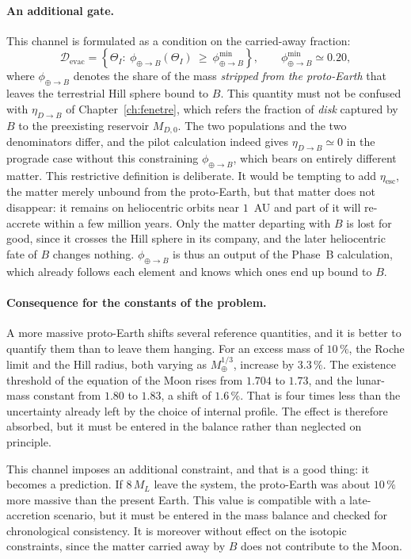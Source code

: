 \documentclass[11pt,a4paper,openany]{report}
\newcommand{\Mt}{M_{\oplus}}
\begin{document}
\paragraph{An additional gate.} This channel is formulated as a condition on the carried-away
fraction:
\begin{equation}
\mathcal{D}_{\mathrm{evac}}=\left\{\Theta_I:\ \phi_{\oplus\to B}(\Theta_I)\ \ge\ \phi_{\oplus\to B}^{\min}\right\},
\qquad \phi_{\oplus\to B}^{\min}\simeq0.20 ,
\label{eq:Devac}
\end{equation}
where $\phi_{\oplus\to B}$ denotes the share of the mass \emph{stripped from the proto-Earth} that leaves the
terrestrial Hill sphere bound to $B$. This quantity must not be confused with $\eta_{D\to B}$ of
Chapter~\ref{ch:fenetre}, which refers the fraction of \emph{disk} captured by $B$ to the
preexisting reservoir $M_{D,0}$. The two populations and the two denominators differ, and the pilot
calculation indeed gives $\eta_{D\to B}\simeq0$ in the prograde case without this constraining
$\phi_{\oplus\to B}$, which bears on entirely different matter. This restrictive definition is deliberate. It would be tempting to
add $\eta_{\mathrm{esc}}$, the matter merely unbound from the proto-Earth, but that matter does not
disappear: it remains on heliocentric orbits near $1$~AU and part of it will re-accrete within a few
million years. Only the matter departing with $B$ is lost for good, since it crosses the Hill sphere
in its company, and the later heliocentric fate of $B$ changes nothing. $\phi_{\oplus\to B}$ is thus an output
of the Phase~B calculation, which already follows each element and knows which ones end up bound to
$B$.

\paragraph{Consequence for the constants of the problem.} A more massive proto-Earth shifts several
reference quantities, and it is better to quantify them than to leave them hanging. For an excess
mass of $10\,\%$, the Roche limit and the Hill radius, both varying as $\Mt^{1/3}$, increase by
$3.3\,\%$. The existence threshold of the equation of the Moon rises from $1.704$ to $1.73$, and the
lunar-mass constant from $1.80$ to $1.83$, a shift of $1.6\,\%$. That is four times less than the
uncertainty already left by the choice of internal profile. The effect is therefore absorbed, but it
must be entered in the balance rather than neglected on principle.

\begin{controle}
This channel imposes an additional constraint, and that is a good thing: it becomes a prediction. If
$8\,M_L$ leave the system, the proto-Earth was about $10\,\%$ more massive than the present Earth.
This value is compatible with a late-accretion scenario, but it must be entered in the mass balance
and checked for chronological consistency. It is moreover without effect on the isotopic
constraints, since the matter carried away by $B$ does not contribute to the Moon.
\end{controle}
\end{document}
